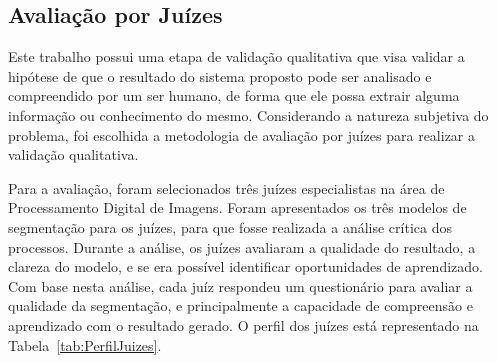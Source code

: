 \documentclass[12pt,oneside,a4paper,english,french,spanish,brazil,]{abntex2}
\begin{document}
\subsection{Avaliação por Juízes}

Este trabalho possui uma etapa de validação qualitativa que visa validar a hipótese de que o resultado do sistema proposto pode ser analisado e compreendido por um ser humano, de forma que ele possa extrair alguma informação ou conhecimento do mesmo. Considerando a natureza subjetiva do problema, foi escolhida a metodologia de avaliação por juízes para realizar a validação qualitativa.

Para a avaliação, foram selecionados três juízes especialistas na área de Processamento Digital de Imagens. Foram apresentados os três modelos de segmentação para os juízes, para que fosse realizada a análise crítica dos processos. Durante a análise, os juízes avaliaram a qualidade do resultado, a clareza do modelo, e se era possível identificar oportunidades de aprendizado. Com base nesta análise, cada juíz respondeu um questionário para avaliar a qualidade da segmentação, e principalmente a capacidade de compreensão e aprendizado com o resultado gerado. O perfil dos juízes está representado na Tabela~\ref{tab:PerfilJuizes}.
\end{document}

